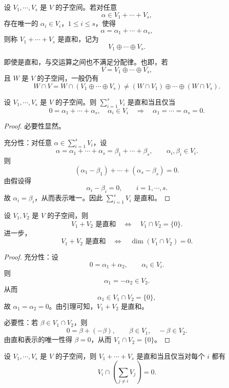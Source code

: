\begin{definition}
	设 $V_1,\cdots,V_s$ 是 $V$ 的子空间。若对任意
	\[
	\alpha\in V_1+\cdots+V_s,
	\]
	存在唯一的 $\alpha_i\in V_i$，$1\leq i\leq s$，使得
	\[
	\alpha=\alpha_1+\cdots+\alpha_s,
	\]
	则称 $V_1+\cdots+V_s$ 是直和，记为
	\[
	V_1\oplus\cdots\oplus V_s.
	\]
\end{definition}

即使是直和，与交运算之间也不满足分配律。也即，若
\[
V=V_1\oplus\cdots\oplus V_s,
\]
且 $W$ 是 $V$ 的子空间，一般仍有
\[
W\cap V
=
W\cap (V_1\oplus\cdots\oplus V_s)
\neq
(W\cap V_1)\oplus\cdots\oplus(W\cap V_s).
\]

\begin{lemma}
	设 $V_1,\cdots,V_s$ 是 $V$ 的子空间。则 $\sum\limits_{i=1}^{s}V_i$ 是直和当且仅当
	\[
	0=\alpha_1+\cdots+\alpha_s,
	\quad \alpha_i\in V_i
	\quad\Longrightarrow\quad
	\alpha_1=\cdots=\alpha_s=0.
	\]
\end{lemma}

\begin{proof}
	必要性显然。
	
	充分性：对任意 $\alpha\in\sum\limits_{i=1}^{s}V_i$，设
	\[
	\alpha=\alpha_1+\cdots+\alpha_s
	=\beta_1+\cdots+\beta_s,
	\qquad
	\alpha_i,\beta_i\in V_i.
	\]
	则
	\[
	(\alpha_1-\beta_1)+\cdots+(\alpha_s-\beta_s)=0.
	\]
	由假设得
	\[
	\alpha_i-\beta_i=0,
	\qquad i=1,\cdots,s.
	\]
	故 $\alpha_i=\beta_i$，从而表示唯一。因此 $\sum\limits_{i=1}^{s}V_i$ 是直和。
\end{proof}

\begin{corollary}
	设 $V_1,V_2$ 是 $V$ 的子空间，则
	\[
	V_1+V_2\text{ 是直和}
	\quad\Longleftrightarrow\quad
	V_1\cap V_2=\{0\}.
	\]
	进一步，
	\[
	V_1+V_2\text{ 是直和}
	\quad\Longleftrightarrow\quad
	\dim(V_1\cap V_2)=0.
	\]
\end{corollary}

\begin{proof}
	充分性：设
	\[
	0=\alpha_1+\alpha_2,
	\qquad
	\alpha_i\in V_i.
	\]
	则
	\[
	\alpha_1=-\alpha_2\in V_2.
	\]
	从而
	\[
	\alpha_1\in V_1\cap V_2=\{0\},
	\]
	故 $\alpha_1=\alpha_2=0$。由引理可知，$V_1+V_2$ 是直和。
	
	必要性：若 $\beta\in V_1\cap V_2$，则
	\[
	0=\beta+(-\beta),
	\qquad
	\beta\in V_1,
	\quad
	-\beta\in V_2.
	\]
	由直和表示的唯一性得 $\beta=0$，从而 $V_1\cap V_2=\{0\}$。
\end{proof}

\begin{corollary}
	设 $V_1,\cdots,V_s$ 是 $V$ 的子空间，则 $V_1+\cdots+V_s$ 是直和当且仅当对每个 $i$ 都有
	\[
	V_i\cap\left(\sum_{j\neq i}V_j\right)=0.
	\]
\end{corollary}

